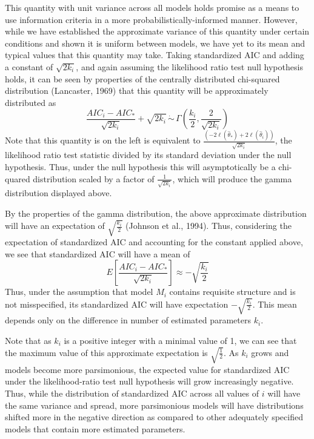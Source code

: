 		This quantity with unit variance across all models holds promise as a means to use information criteria in a more probabilistically-informed manner. However, while we have established
		the approximate variance of this quantity under certain conditions and shown it is uniform between models, we have yet to its mean and typical values that this quantity may take. Taking
		standardized AIC and adding a constant of $\sqrt{2 k_i}$, and again assuming the likelihood ratio test null hypothesis holds, it can be seen by properties of the centrally distributed
		chi-squared distribution (Lancaster, 1969) that this quantity will be approximately distributed as
		\begin{equation}
			\frac{AIC_i - AIC_*}{\sqrt{2k_i}} + \sqrt{2k_i} \, \dot\sim \, \Gamma \left( \frac{k_i}{2}, \frac{2}{\sqrt{2k_i}} \right)
		\end{equation}
		Note that this quantity is on the left is equivalent to $\frac{ \left( -2 \ell (\hat{\theta}_*) + 2 \ell (\hat{\theta}_i) \right) }{\sqrt{2k_i}}$, the likelihood ratio test statistic
		divided by its standard deviation under the null hypothesis. Thus, under the null hypothesis this will asymptotically be a chi-quared distribution scaled by a factor of $\frac{1}{\sqrt{2k_i}}$,
		which will produce the gamma distribution displayed above.

		By the properties of the gamma distribution, the above approximate distribution will have an expectation of $\sqrt{\frac{k_i}{2}}$ (Johnson et al., 1994). Thus, considering the expectation
		of standardized AIC and accounting for the constant applied above, we see that standardized AIC will have a mean of
		\begin{equation}
			E \left[ \frac{AIC_i - AIC_*}{\sqrt{2k_i}} \right] \approx -\sqrt{\frac{k_i}{2}}
		\end{equation}
		Thus, under the assumption that model $M_i$ contains requisite structure and is not misspecified, its standardized AIC will have expectation $-\sqrt{\frac{k_i}{2}}$. This mean depends only
		on the difference in number of estimated parameters $k_i$.

		Note that as $k_i$ is a positive integer with a minimal value of 1, we can see that the maximum value of this approximate expectation is $\sqrt{\frac{1}{2}}$. As $k_i$ grows and models
		become more parsimonious, the expected value for standardized AIC under the likelihood-ratio test null hypothesis will grow increasingly negative. Thus, while the distribution of
		standardized AIC across all values of $i$ will have the same variance and spread, more parsimonious models will have distributions shifted more in the negative direction as
		compared to other adequately specified models that contain more estimated parameters.

